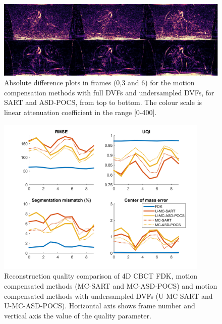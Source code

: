 \begin{figure}
\begin{center}

\includegraphics[width=\textwidth]{accuracyMC/diffUMCCBCT3stage.png} 


\end{center}

\caption[Three difference frames of the undersampled motion compensation methods]{\label{fig:UMCCBCT3static} Absolute difference plots in frames (0,3 and 6) for the motion compensation methods with full DVFs and undersampled DVFs, for SART and ASD-POCS, from top to bottom.  The colour scale is linear attenuation coefficient in the range [0-400].} 
\end{figure}


\begin{figure}
\begin{center}

\includegraphics[width=0.9\textwidth]{accuracyMC/UMCCBCTparams.png} 


\end{center}

\caption[Reconstruction quality comparison of motion compensation]{\label{fig:UMCCBCTquality} Reconstruction quality comparison of 4D CBCT FDK, motion compensated methods (MC-SART and MC-ASD-POCS) and motion compensated methods with undersampled DVFs (U-MC-SART and U-MC-ASD-POCS). Horizontal axis shows frame number and vertical axis the value of the quality parameter.} 
\end{figure}
